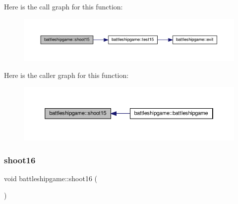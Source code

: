 Here is the call graph for this function\+:
\nopagebreak
\begin{figure}[H]
\begin{center}
\leavevmode
\includegraphics[width=350pt]{classbattleshipgame_a3b024b5ad7c747303c00b740f0921751_cgraph}
\end{center}
\end{figure}
Here is the caller graph for this function\+:
\nopagebreak
\begin{figure}[H]
\begin{center}
\leavevmode
\includegraphics[width=350pt]{classbattleshipgame_a3b024b5ad7c747303c00b740f0921751_icgraph}
\end{center}
\end{figure}
\mbox{\label{classbattleshipgame_a1dddc9c9d3ced3792fc33ec510976e8f}} 
\subsubsection{\texorpdfstring{shoot16}{shoot16}}
{\footnotesize\ttfamily void battleshipgame\+::shoot16 (\begin{DoxyParamCaption}{ }\end{DoxyParamCaption})\hspace{0.3cm}{\ttfamily [slot]}}

